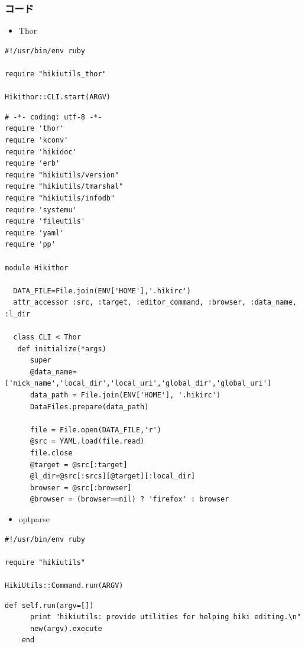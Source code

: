 \subsubsection{コード}\begin{itemize}
\item Thor
\end{itemize}\begin{lstlisting}[style=customRuby]
#!/usr/bin/env ruby                                                             

require "hikiutils_thor"

Hikithor::CLI.start(ARGV)
\end{lstlisting}\begin{lstlisting}[style=customRuby]
# -*- coding: utf-8 -*-                                                         
require 'thor'
require 'kconv'
require 'hikidoc'
require 'erb'
require "hikiutils/version"
require "hikiutils/tmarshal"
require "hikiutils/infodb"
require 'systemu'
require 'fileutils'
require 'yaml'
require 'pp'

module Hikithor

  DATA_FILE=File.join(ENV['HOME'],'.hikirc')
  attr_accessor :src, :target, :editor_command, :browser, :data_name, :l_dir

  class CLI < Thor
   def initialize(*args)
      super
      @data_name=['nick_name','local_dir','local_uri','global_dir','global_uri']
      data_path = File.join(ENV['HOME'], '.hikirc')
      DataFiles.prepare(data_path)

      file = File.open(DATA_FILE,'r')
      @src = YAML.load(file.read)
      file.close
      @target = @src[:target]
      @l_dir=@src[:srcs][@target][:local_dir]
      browser = @src[:browser]
      @browser = (browser==nil) ? 'firefox' : browser

\end{lstlisting}\begin{itemize}
\item optparse
\end{itemize}\begin{lstlisting}[style=customRuby]
#!/usr/bin/env ruby                                                             

require "hikiutils"

HikiUtils::Command.run(ARGV)
\end{lstlisting}\begin{lstlisting}[style=customRuby]
    def self.run(argv=[])
      print "hikiutils: provide utilities for helping hiki editing.\n"
      new(argv).execute
    end


\end{lstlisting}
